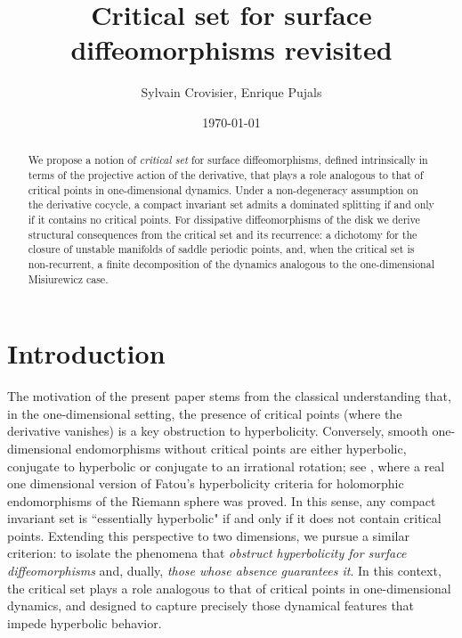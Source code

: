 \documentclass[a4paper,11pt]{article}
\date{\today}
\title{Critical set for surface diffeomorphisms revisited}
\author{Sylvain Crovisier, Enrique Pujals}
\theoremstyle{definition}
\begin{document}
\maketitle
\begin{abstract}
We propose a notion of \emph{critical set} for surface diffeomorphisms, defined intrinsically in terms of the projective action of the derivative, that plays a role analogous to that of critical points in one-dimensional dynamics. Under a non-degeneracy assumption on the derivative cocycle, a compact invariant set admits a dominated splitting if and only if it contains no critical points. 
For dissipative diffeomorphisms of the disk we derive structural
consequences from the critical set and its recurrence: a dichotomy for
the closure of unstable manifolds of saddle periodic points, and, when the critical set is
non-recurrent, a finite decomposition of the dynamics analogous to the
one-dimensional Misiurewicz case.




\end{abstract}
\section{Introduction}




The motivation of the present paper stems from the classical understanding that, in the one-dimensional setting, the presence of critical points (where the derivative vanishes)  is a key obstruction to hyperbolicity. Conversely, smooth  one-dimensional endomorphisms without critical points are either hyperbolic, conjugate to hyperbolic or conjugate to an irrational rotation; see \cite{M}, where a real one dimensional version of Fatou's hyperbolicity criteria for holomorphic endomorphisms of the Riemann sphere was proved. In this sense, any compact invariant set is ``essentially hyperbolic" if and only if it does not contain critical points.
Extending this perspective to two dimensions, we pursue a similar criterion: to isolate the phenomena that {\em obstruct hyperbolicity for surface diffeomorphisms} and, dually, {\em those whose absence guarantees it}. In this context, the critical set plays a role analogous to that of critical points in one-dimensional dynamics, and designed to capture precisely those dynamical features that impede hyperbolic behavior.
\end{document}
